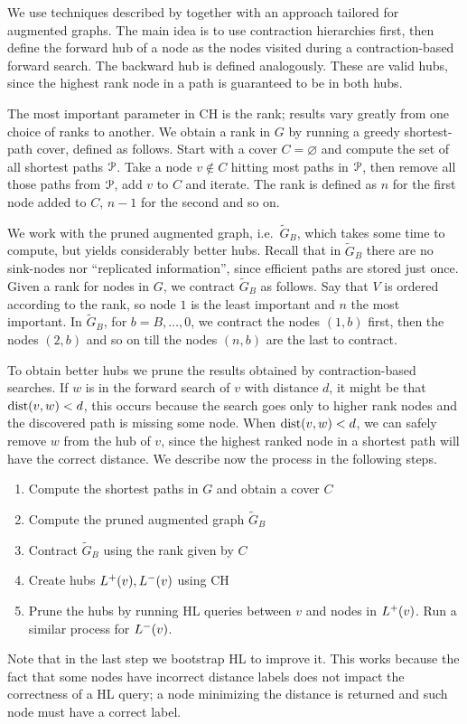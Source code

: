 We use techniques described by \cite{hubimplem} together with an approach tailored for augmented graphs.
The main idea is to use contraction hierarchies first, then define the forward hub of a node as the nodes visited during a contraction-based forward search.
The backward hub is defined analogously.
These are valid hubs, since the highest rank node in a path is guaranteed to be in both hubs.

The most important parameter in CH is the rank; results vary greatly from one choice of ranks to another.
We obtain a rank in $G$ by running a greedy shortest-path cover, defined as follows.
Start with a cover $C=\varnothing$ and compute the set of all shortest paths $\mathcal{P}$.
Take a node $v\notin C$ hitting most paths in $\mathcal{P}$, then remove all those paths from $\mathcal{P}$, add $v$ to $C$ and iterate.
The rank is defined as $n$ for the first node added to $C$, $n-1$ for the second and so on.

We work with the pruned augmented graph, i.e.\ $\tilde G_B$, which takes some time to compute, but yields considerably better hubs. 
Recall that in $\tilde G_B$ there are no sink-nodes nor ``replicated information'', since efficient paths are stored just once.
Given a rank for nodes in $G$, we contract $\tilde G_B$ as follows.
Say that $V$ is ordered according to the rank, so node $1$ is the least important and $n$ the most important.
In $\tilde G_B$, for $b=B,\ldots,0$, we contract the nodes $(1,b)$ first, then the nodes $(2,b)$ and so on till the nodes $(n,b)$ are the last to contract. 

To obtain better hubs we prune the results obtained by contraction-based searches.
If $w$ is in the forward search of $v$ with distance $d$, it might be that $\text{dist}(v,w)<d$, this occurs because the search goes only to higher rank nodes and the discovered path is missing some node.
When $\text{dist}(v,w)<d$, we can safely remove $w$ from the hub of $v$, since the highest ranked node in a shortest path will have the correct distance.
We describe now the process in the following steps.

\begin{enumerate}[nosep]
\item Compute the shortest paths in $G$ and obtain a cover $C$
\item Compute the pruned augmented graph $\tilde G_B$
\item Contract $\tilde G_B$ using the rank given by $C$
\item Create hubs $L^+(v),L^-(v)$ using CH
\item Prune the hubs by running HL queries between $v$ and nodes in $L^+(v)$. 
Run a similar process for $L^-(v)$.
\end{enumerate}
Note that in the last step we bootstrap HL to improve it.
This works because the fact that some nodes have incorrect distance labels does not impact the correctness of a HL query; a node minimizing the distance is returned and such node must have a correct label.

